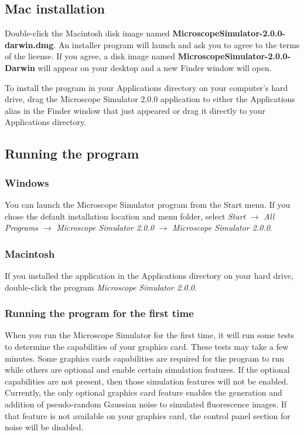 \documentclass[11pt,titlepage]{article}
\begin{document}
\subsection{Mac installation}

Double-click the Macintosh disk image named \textbf{MicroscopeSimulator-2.0.0-darwin.dmg}. An installer program will launch and ask you to agree to the terms of the license. If you agree, a disk image named \textbf{MicroscopeSimulator-2.0.0-Darwin} will appear on your desktop and a new Finder window will open.

To install the program in your Applications directory on your computer's hard drive, drag the Microscope Simulator 2.0.0 application to either the Applications alias in the Finder window that just appeared or drag it directly to your Applications directory.

\subsection{Running the program}

\subsubsection{Windows}

You can launch the Microscope Simulator program from the Start menu. If you chose the default installation location and menu folder, select \emph{Start} $\rightarrow$ \emph{All Programs} $\rightarrow$ \emph{Microscope Simulator 2.0.0} $\rightarrow$ \emph{Microscope Simulator 2.0.0}.

\subsubsection{Macintosh}

If you installed the application in the Applications directory on your hard drive, double-click the program \emph{Microscope Simulator 2.0.0}.

\subsubsection{Running the program for the first time}

When you run the Microscope Simulator for the first time, it will run some tests to determine the capabilities of your graphics card. These tests may take a few minutes. Some graphics cards capabilities are required for the program to run while others are optional and enable certain simulation features. If the optional capabilities are not present, then those simulation features will not be enabled. Currently, the only optional graphics card feature enables the generation and addition of pseudo-random Gaussian noise to simulated fluorescence images. If that feature is not available on your graphics card, the control panel section for noise will be disabled.
\end{document}

